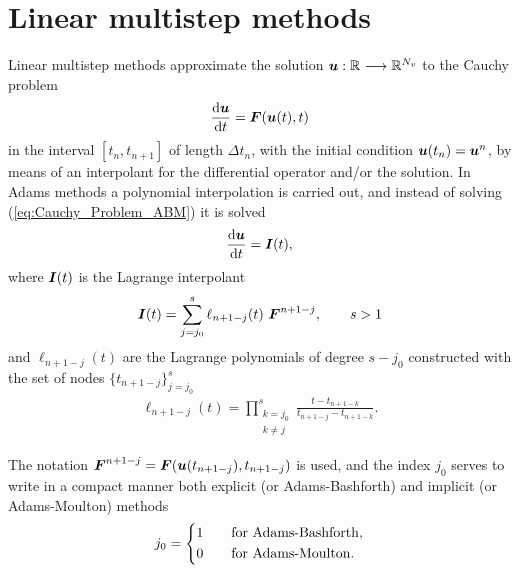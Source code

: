 \section{Linear multistep methods}\label{sec:ABM}
Linear multistep methods approximate the solution $\boldsymbol{u} : \mathbb{R}^{} \longrightarrow \mathbb{R}^{N_v}$ to the Cauchy problem
%
\begin{align}
	\dv{\boldsymbol{u}}{t}
	=
	\boldsymbol{F}(\boldsymbol{u}(t),t)
	\label{eq:Cauchy_Problem_ABM}
\end{align}
in the interval $[t_n,t_{n+1}]$ of length $\Delta t_n$, with the initial condition $\boldsymbol{u}(t_n)=\boldsymbol{u}^n$, by means of an interpolant for the differential operator and/or the solution. In Adams methods a polynomial interpolation is carried out, and instead of solving (\ref{eq:Cauchy_Problem_ABM}) it is solved
%
\begin{align}
	\dv{\boldsymbol{u}}{t}
	=
	\boldsymbol{I}(t),
	\label{eq:Approximate_Cauchy_Problem_ABM}
\end{align}
where $\boldsymbol{I}(t)$ is the Lagrange interpolant
%
\begin{align}
	\boldsymbol{I}(t)
	=
	\sum_{j=j_0}^{s}
	\ell_{n+1-j}(t)\ \boldsymbol{F}^{n+1-j},
	\qquad s > 1
	\label{eq:ABM_Interpolant}
\end{align}
and $\ell_{n+1-j}(t)$ are the Lagrange polynomials of degree $s-j_0$ constructed with the set of nodes $\{t_{n+1-j}\}_{j=j_0}^{s}$
%
\begin{align}
	\ell_{n+1-j}(t)
	=
	\prod_{\substack{k=j_0\\k\ne j}}^{s}
	\frac{t-t_{n+1-k}}{t_{n+1-j}-t_{n+1-k}}.
\end{align}

The notation $\boldsymbol{F}^{n+1-j}=\boldsymbol{F}(\boldsymbol{u}(t_{n+1-j}),t_{n+1-j})$ is used, and the index $j_0$ serves to write in a compact manner both explicit (or Adams-Bashforth) and implicit (or Adams-Moulton) methods
%
\begin{align}
	j_0
	=
	\begin{dcases}
		1\qquad \mbox{for Adams-Bashforth},
		\\
		0\qquad \mbox{for Adams-Moulton}.
	\end{dcases}
\end{align}

